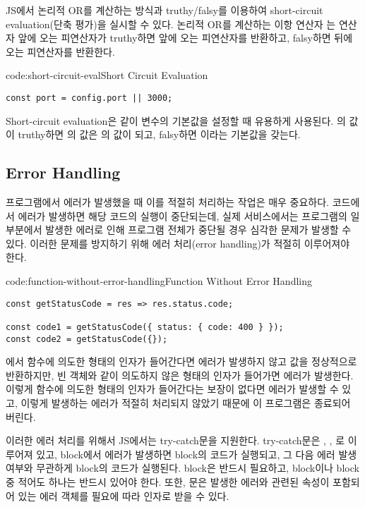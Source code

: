 JS에서 논리적 OR를 계산하는 방식과 truthy/falsy를 이용하여 short-circuit evaluation(단축 평가)을 실시할 수 있다. 논리적 OR를 계산하는 이항 연산자 \cd{||}는 연산자 앞에 오는 피연산자가 truthy하면 앞에 오는 피연산자를 반환하고, falsy하면 뒤에 오는 피연산자를 반환한다.

\begin{codeenv}{code:short-circuit-eval}{Short Circuit Evaluation}\begin{verbatim}
const port = config.port || 3000;
\end{verbatim}
\end{codeenv}

Short-circuit evaluation은 \과 같이 변수의 기본값을 설정할 때 유용하게 사용된다. 의 값이 truthy하면 의 값은 의 값이 되고, falsy하면 이라는 기본값을 갖는다.
\clearpage

\subsection*{Error Handling}

프로그램에서 에러가 발생했을 때 이를 적절히 처리하는 작업은 매우 중요하다. 코드에서 에러가 발생하면 해당 코드의 실행이 중단되는데, 실제 서비스에서는 프로그램의 일부분에서 발생한 에러로 인해 프로그램 전체가 중단될 경우 심각한 문제가 발생할 수 있다. 이러한 문제를 방지하기 위해 에러 처리(error handling)가 적절히 이루어져야 한다.

\begin{codeenv}{code:function-without-error-handling}{Function Without Error Handling}\begin{verbatim}
const getStatusCode = res => res.status.code;

const code1 = getStatusCode({ status: { code: 400 } });
const code2 = getStatusCode({});
\end{verbatim}
\end{codeenv}

에서  함수에 의도한 형태의 인자가 들어간다면 에러가 발생하지 않고 값을 정상적으로 반환하지만, 빈 객체와 같이 의도하지 않은 형태의 인자가 들어가면 에러가 발생한다. 이렇게 함수에 의도한 형태의 인자가 들어간다는 보장이 없다면 에러가 발생할 수 있고, 이렇게 발생하는 에러가 적절히 처리되지 않았기 때문에 이 프로그램은 종료되어 버린다.

이러한 에러 처리를 위해서 JS에서는 try-catch문을 지원한다. try-catch문은 , , 로 이루어져 있고,  block에서 에러가 발생하면  block의 코드가 실행되고, 그 다음 에러 발생 여부와 무관하게  block의 코드가 실행된다.  block은 반드시 필요하고,  block이나  block 중 적어도 하나는 반드시 있어야 한다. 또한,  문은 발생한 에러와 관련된 속성이 포함되어 있는 에러 객체를 필요에 따라 인자로 받을 수 있다.

